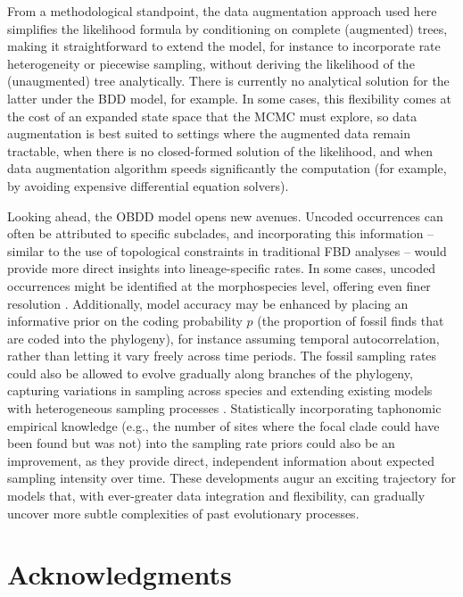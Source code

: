 \documentclass[oupdraft]{sysbio}
\newcommand{\revised}[1]{{\color{blue} #1}}
\begin{document}
\revised{From a methodological standpoint, the data augmentation approach used here simplifies the likelihood formula by conditioning on complete (augmented) trees, making it straightforward to extend the model, for instance to incorporate rate heterogeneity or piecewise sampling, without deriving the likelihood of the (unaugmented) tree analytically. There is currently no analytical solution for the latter under the BDD model, for example. In some cases, this flexibility comes at the cost of an expanded state space that the MCMC must explore, so data augmentation is best suited to settings where the augmented data remain tractable, when there is no closed-formed solution of the likelihood, and when data augmentation algorithm speeds significantly the computation (for example, by avoiding expensive differential equation solvers).}

Looking ahead, the OBDD model opens new avenues. \revised{Uncoded} occurrences can often be attributed to specific subclades, and incorporating this information -- similar to the use of topological constraints in traditional FBD analyses \citep{baridosottani_putting_2023} -- would provide more direct insights into lineage-specific rates. In some cases, \revised{uncoded} occurrences might be identified at the morphospecies level, offering even finer resolution \citep{silvestro_bayesian_2014, stadler_fossilized_2018}.  \revised{Additionally, model accuracy may be enhanced by placing an informative prior on the coding probability $p$ (the proportion of fossil finds that are coded into the phylogeny), for instance assuming temporal autocorrelation, rather than letting it vary freely across time periods.} The fossil sampling rates could also be allowed to evolve gradually along branches of the phylogeny, capturing variations in sampling across species and extending existing models with heterogeneous sampling processes \citep{barido-sottani_integrating_2025}. Statistically incorporating taphonomic empirical knowledge (e.g., the number of sites where the focal clade could have been found but was not) into the sampling rate priors could also be an improvement, as they provide direct, independent information about expected sampling intensity over time.  These developments augur an exciting trajectory for models that, with ever-greater data integration and flexibility, can gradually uncover more subtle complexities of past evolutionary processes.

\section{Acknowledgments}
\end{document}
